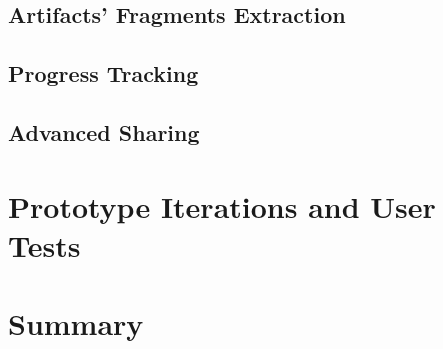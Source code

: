 \subsection{Artifacts' Fragments Extraction}

\subsection{Progress Tracking}

\subsection{Advanced Sharing}

\section{Prototype Iterations and User Tests}
 
\section{Summary}